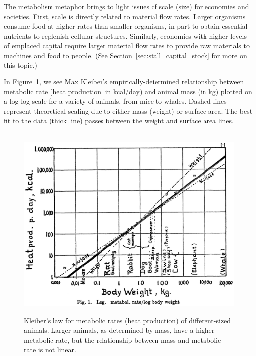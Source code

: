 The metabolism metaphor brings to light issues of scale (size)
for economies and societies.
First, scale is directly related to material flow rates.
Larger organisms consume food at higher rates than smaller organisms,
in part to obtain essential nutrients to replenish cellular structures.
Similarly, economies with higher levels of emplaced capital
require larger material flow rates to provide 
raw materials to machines and food to people.
(See Section~\ref{sec:stall_capital_stock} for more on this topic.)

In Figure~\ref{fig:Kleiber_law},
we see Max Kleiber's empirically-determined relationship between
metabolic rate (heat production, in kcal/day) and
animal mass (in kg)
plotted on a log-log scale
for a variety of animals,
from mice to whales.
Dashed lines represent theoretical scaling due to either mass (weight)
or surface area.
The best fit to the data (thick line)
passes between the weight and surface area lines.

\begin{figure}[!ht]
\centering\
\includegraphics[width=\linewidth]{Part_0/Chapter_Acct_For_WoN/images/Kleiber1947.pdf}
\caption[Kleiber's law for metabolic rates of animals]{Kleiber's law 
for metabolic rates (heat production) of different-sized animals.\cite[p.~530]{Kleiber1947}
Larger animals, as determined by mass, have a higher metabolic rate, 
but the relationship between mass and metabolic rate is not linear.}
\label{fig:Kleiber_law}
\end{figure}

